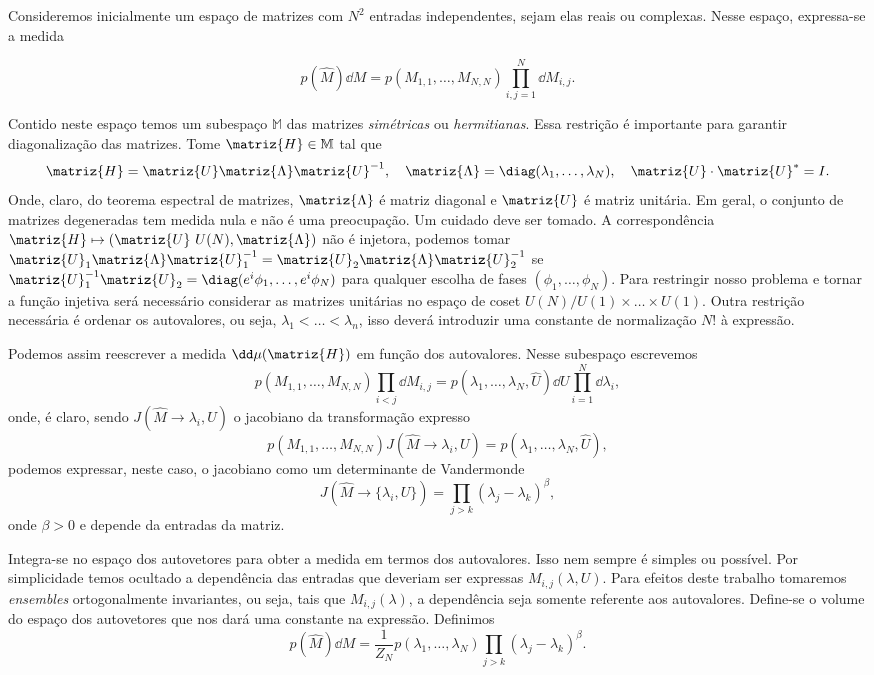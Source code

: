Consideremos inicialmente um espaço de matrizes com $N^2$ entradas independentes, sejam elas reais ou complexas. Nesse espaço, expressa-se a medida

\begin{equation}
	p(\hat{M}) \dd M = p(M_{1,1}, \dots, M_{N,N}) \prod_{i,j=1}^{N} \dd M_{i,j}.
\end{equation}

Contido neste espaço temos um subespaço $\mathbb{M}$ das matrizes \textit{simétricas} ou \textit{hermitianas}. Essa restrição é importante para garantir diagonalização das matrizes. Tome $\matriz{H} \in \mathbb{M}$ tal que $$\matriz{H} = \matriz{U} \matriz{\Lambda} \matriz{U}^{-1}, \quad \matriz{\Lambda} = \diag(\lambda_1, \dots, \lambda_N), \quad \matriz{U}\cdot\matriz{U}^* = I.$$
Onde, claro, do teorema espectral de matrizes, $\matriz{\Lambda}$ é matriz diagonal e $\matriz{U}$ é matriz unitária. Em geral, o conjunto de matrizes degeneradas tem medida nula e não é uma preocupação.  Um cuidado deve ser tomado. A correspondência $\matriz{H} \mapsto (\matriz{U} \ U(N), \matriz{\Lambda})$ não é injetora, podemos tomar $\matriz{U}_1 \matriz{\Lambda} \matriz{U}_1^{-1} = \matriz{U}_2 \matriz{\Lambda} \matriz{U}_2^{-1}$ se $\matriz{U}_1^{-1} \matriz{U}_2 = \diag(e^i\phi_1, \dots, e^i\phi_N)$ para qualquer escolha de fases $(\phi_1, \dots, \phi_N)$. Para restringir nosso problema e tornar a função injetiva será necessário considerar as matrizes unitárias no espaço de coset  $U(N) / U(1) \times \dots \times U(1)$.  Outra restrição necessária é ordenar os autovalores, ou seja, $\lambda_1 < \dots < \lambda_n$, isso deverá introduzir uma constante de normalização $N!$ à expressão.

Podemos assim reescrever a medida $\dd\mu(\matriz{H})$ em função dos autovalores. Nesse subespaço escrevemos
\[
	p(M_{1,1}, \dots, M_{N,N}) \prod_{i<j} \dd M_{i,j} = p(\lambda_1, \dots, \lambda_N, \hat{U}) \dd U \prod_{i=1}^N \dd\lambda_{i},
\]
onde, é claro, sendo $J(\hat{M} \rightarrow {\lambda_i, U})$ o jacobiano da transformação expresso
\[
		p(M_{1,1}, \dots, M_{N,N}) J(\hat{M} \rightarrow {\lambda_i, U})= p(\lambda_1, \dots, \lambda_N, \hat{U}),
\]
podemos expressar, neste caso, o jacobiano como um determinante de Vandermonde
\begin{equation}
	J(\hat{M} \rightarrow \{\lambda_i, U\}) = \prod_{j>k} (\lambda_j - \lambda_{k})^\beta,
\end{equation}
onde $\beta > 0$ e depende da entradas da matriz. 

Integra-se no espaço dos autovetores para obter a medida em termos dos autovalores. Isso nem sempre é simples ou possível. Por simplicidade temos ocultado a dependência das entradas que deveriam ser expressas $M_{i,j}(\lambda, U)$.  Para efeitos deste trabalho tomaremos \textit{ensembles} ortogonalmente invariantes, ou seja, tais que $M_{i,j}(\lambda)$, a dependência seja somente referente aos autovalores. Define-se o volume do espaço dos autovetores que nos dará uma constante na expressão. Definimos
\begin{equation}
	p(\hat{M}) \dd M =  \frac{1}{Z_N} p(\lambda_1, \dots, \lambda_N) \prod_{j>k} (\lambda_j - \lambda_{k})^\beta.
\end{equation}

